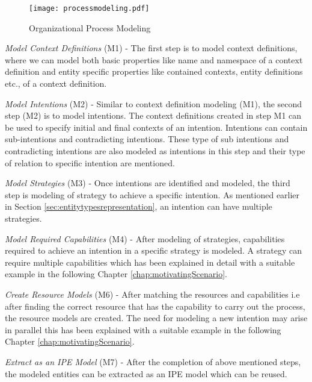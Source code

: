 \begin{figure}
		\centering
		\texttt{[image: processmodeling.pdf]}
		\caption{Organizational Process Modeling}
		\label{fig:processdiagram}
\end{figure}

\textit{Model Context Definitions} (M1) -  The first step is to model context definitions, where we can model both basic properties like name and namespace of a context definition and entity specific properties like contained contexts, entity definitions etc., of a context definition.  

\textit{Model Intentions} (M2) -  Similar to context definition modeling (M1), the second step (M2) is to model intentions. The context definitions created in step M1 can be used to specify initial and final contexts of an intention. Intentions can contain sub-intentions and contradicting intentions. These type of sub intentions and contradicting intentions are also modeled as intentions in this step and their type of relation to specific intention are mentioned. 

\textit{Model Strategies} (M3) -  Once intentions are identified and modeled, the third step is modeling of strategy to achieve a specific intention. As mentioned earlier in Section \ref{sec:entitytypesrepresentation}, an intention can have multiple strategies. 

\textit{Model Required Capabilities} (M4) - After modeling of strategies, capabilities required to achieve an intention in a specific strategy is modeled. A strategy can require multiple capabilities which has been explained in detail with a suitable example in the following Chapter \ref{chap:motivatingScenario}. 

\textit{Create Resource Models} (M6) -  After matching the resources and capabilities i.e after finding the correct resource that has the capability to carry out the process, the resource models are created. The need for modeling a new intention may arise in parallel this has been explained with a suitable example in the following Chapter \ref{chap:motivatingScenario}.   

\textit{Extract as an IPE Model} (M7) -  After the completion of above mentioned steps, the modeled entities can be extracted as an IPE model which can be reused. 

